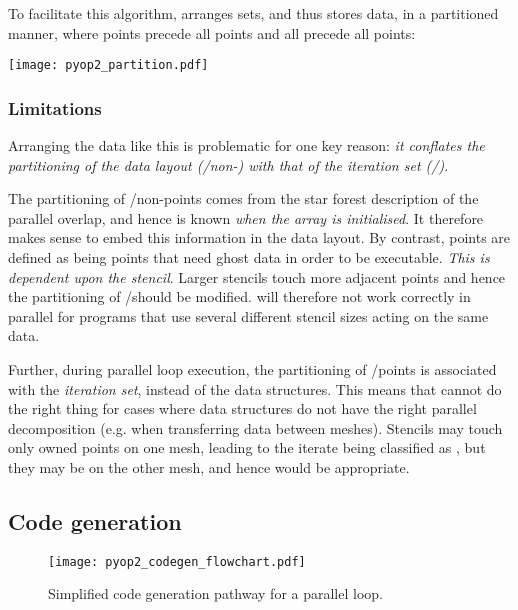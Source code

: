 \documentclass[thesis]{subfiles}
\begin{document}
To facilitate this algorithm,  arranges sets, and thus stores data, in a partitioned manner, where \coreiter points precede all \ownediter points and all \ownediter precede all \ghostiter points:
\begin{center}
  \texttt{[image: pyop2\_partition.pdf]}
\end{center}

\subsubsection{Limitations}

Arranging the data like this is problematic for one key reason: \emph{it conflates the partitioning of the data layout (\ghostitertight/non-\ghostitertight) with that of the iteration set (\coreitertight/\owneditertight)}.

The partitioning of \ghostitertight/non-\ghostitertight points comes from the star forest description of the parallel overlap, and hence is known \emph{when the array is initialised}.
It therefore makes sense to embed this information in the data layout.
By contrast, \ownediter points are defined as being points that need ghost data in order to be executable.
\emph{This is dependent upon the stencil}.
Larger stencils touch more adjacent points and hence the partitioning of \coreitertight/\owneditertight should be modified.
 will therefore not work correctly in parallel for programs that use several different stencil sizes acting on the same data.

Further, during parallel loop execution, the partitioning of \coreitertight/\owneditertight points is associated with the \emph{iteration set}, instead of the data structures.
This means that  cannot do the right thing for cases where data structures do not have the right parallel decomposition (e.g. when transferring data between meshes).
  Stencils may touch only owned points on one mesh, leading to the iterate being classified as \coreiter, but they may be \ghostiter on the other mesh, and hence \ownediter would be appropriate.

\subsection{Code generation}
\label{sec:pyop2_codegen}

\begin{figure}
  \texttt{[image: pyop2\_codegen\_flowchart.pdf]}
  \caption{Simplified code generation pathway for a  parallel loop.}
  \label{fig:pyop2_codegen}
\end{figure}
\end{document}
